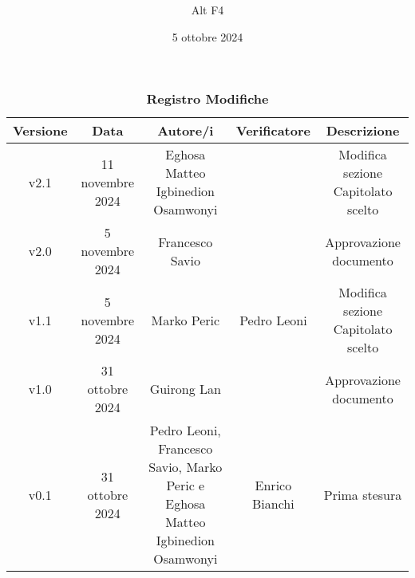 \documentclass[a4paper, 12pt]{article}
\title{\Huge \textbf{\titolo}}
\author{\Large{Alt} \raisebox{0.3ex}{\normalsize  +} \Large{F4}}
\date{5 ottobre 2024}
\def\logo{../Immagini/logo.jpeg}
\def\ultima-versione{v2.1}
\begin{document}
\begin{titlepage}      
    \maketitle
    \thispagestyle{empty}  

\end{titlepage}

\thispagestyle{plain}
\begin{table}[!h]
    \centering
    \caption*{\textbf{\Large Registro Modifiche}}
    {\renewcommand{\arraystretch}{2}
    \begin{tabularx}{\textwidth}{| c | c | C | C | C |}
        \hline
            \textbf{\normalsize Versione} & 
            \textbf{\normalsize Data} & 
            \textbf{\normalsize Autore/i} & 
            \textbf{\normalsize Verificatore} &
            \textbf{\normalsize Descrizione} \\ 
        \hline \hline
        \ultima-versione & 
        11 novembre 2024 & 
        Eghosa Matteo Igbinedion Osamwonyi&
        & 
        Modifica sezione Capitolato scelto \\ 
    \hline 
        v2.0 & 
        5 novembre 2024 & 
        Francesco Savio &
        & 
        Approvazione documento \\ 
    \hline 
        v1.1 & 
        5 novembre 2024 & 
        Marko Peric & 
        Pedro Leoni&
        Modifica sezione Capitolato scelto \\ 
        \hline
            v1.0 & 
            31 ottobre 2024 & 
            Guirong Lan &
            & 
            Approvazione documento \\ 
        \hline 
            v0.1 & 
            31 ottobre 2024 & 
            \raggedright Pedro Leoni, Francesco Savio, Marko Peric e Eghosa Matteo Igbinedion Osamwonyi & 
            Enrico Bianchi&
            Prima stesura \\ 
        \hline 
    \end{tabularx}}
\end{table}
\restoregeometry
\end{document}
